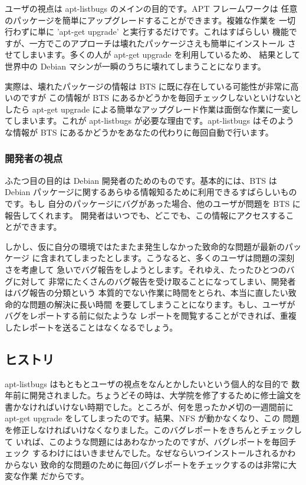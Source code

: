 \documentclass[mingoth,a4paper]{jsarticle}
\begin{document}
ユーザの視点は apt-listbugs のメインの目的です。APT フレームワークは
任意のパッケージを簡単にアップグレードすることができます。複雑な作業を
一切行わずに単に 'apt-get upgrade' と実行するだけです。これはすばらしい
機能ですが、一方でこのアプローチは壊れたパッケージさえも簡単にインストール
させてしまいます。多くの人が apt-get upgrade を利用しているため、
結果として世界中の Debian マシンが一瞬のうちに壊れてしまうことになります。

実際は、壊れたパッケージの情報は BTS に既に存在している可能性が非常に高いのですが
この情報が BTS にあるかどうかを毎回チェックしないといけないとしたら apt-get upgrade
による簡単なアップグレード作業は面倒な作業に一変してしまいます。これが
apt-listbugs が必要な理由です。apt-listbugs はそのような情報が BTS
にあるかどうかをあなたの代わりに毎回自動で行います。

\subsubsection{開発者の視点}

ふたつ目の目的は Debian 開発者のためのものです。基本的には、BTS は Debian
パッケージに関するあらゆる情報知るために利用できるすばらしいものです。もし
自分のパッケージにバグがあった場合、他のユーザが問題を BTS に報告してくれます。
開発者はいつでも、どこでも、この情報にアクセスすることができます。

しかし、仮に自分の環境ではたまたま発生しなかった致命的な問題が最新のパッケージ
に含まれてしまったとします。こうなると、多くのユーザは問題の深刻さを考慮して
急いでバグ報告をしようとします。それゆえ、たったひとつのバグに対して
非常にたくさんのバグ報告を受け取ることになってしまい、開発者はバグ報告の分類という
本質的でない作業に時間をとられ、本当に直したい致命的な問題の解決に長い時間
を要してしまうことになります。もし、ユーザがバグをレポートする前に似たような
レポートを閲覧することができれば、重複したレポートを送ることはなくなるでしょう。

\subsection{ヒストリ}

apt-listbugs はもともとユーザの視点をなんとかしたいという個人的な目的で
数年前に開発されました。ちょうどその時は、大学院を修了するために修士論文を
書かなければいけない時期でした。ところが、何を思ったか〆切の一週間前に
apt-get upgrade をしてしまったのです。結果、NFS が動かなくなり、この
問題を修正しなければいけなくなりました。このバグレポートをきちんとチェックして
いれば、このような問題にはあわなかったのですが、バグレポートを毎回チェック
するわけにはいきませんでした。なぜならいつインストールされるかわからない
致命的な問題のために毎回バグレポートをチェックするのは非常に大変な作業
だからです。
\end{document}
